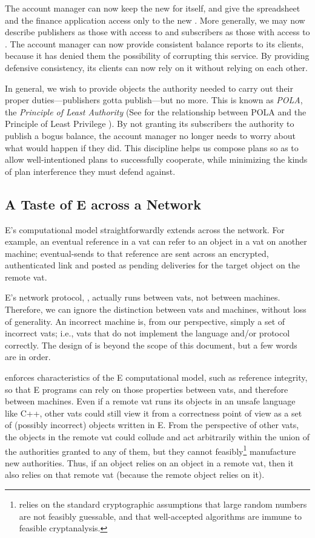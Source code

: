 \documentclass{llncs}
\begin{document}
The account manager can now keep the new  for
itself, and give the spreadsheet and the finance application access
only to the new . More generally, we may now
describe publishers as those with access to  and
subscribers as those with access to . The account
manager can now provide consistent balance reports to its clients,
because it has denied them the possibility of corrupting this
service. By providing defensive consistency, its clients can now rely
on it without relying on each other.

In general, we wish to provide
objects the authority needed to carry out their proper
duties---publishers gotta publish---but no more. This is known as
\emph{POLA}, the \emph{Principle of Least Authority} (See
\cite{miller:paradigm} for the relationship between POLA and the
Principle of Least Privilege \cite{SaltzerSc75}). By not granting its
subscribers the authority to publish a bogus balance, the account
manager no longer needs to worry about what would happen if they
did. This discipline helps us compose plans so as to allow
well-intentioned plans to successfully cooperate, while minimizing the
kinds of plan interference they must defend against.

\subsection{A Taste of E across a Network}

E's computational model straightforwardly extends across the network.
For example, an eventual reference in a vat can refer to an object in
a vat on another machine; eventual-sends to that reference are sent
across an encrypted, authenticated link and posted as pending
deliveries for the target object on the remote vat.

E's network protocol, , actually runs between vats, not
between machines. Therefore, we can ignore the distinction between
vats and machines, without loss of generality. An incorrect machine
is, from our perspective, simply a set of incorrect vats; i.e., vats
that do not implement the language and/or protocol correctly. The
design of  is beyond the scope of this document, but a
few words are in order.

 enforces characteristics of the E computational model,
such as reference integrity, so that E programs can rely on those
properties between vats, and therefore between machines. Even if a
remote vat runs its objects in an unsafe language like C++, other vats
could still view it from a correctness point of view as a set of
(possibly incorrect) objects written in E. From the perspective of
other vats, the objects in the remote vat could collude and act
arbitrarily within the union of the authorities granted to any of
them, but they cannot feasibly\footnote{
%
 relies on the standard cryptographic assumptions that
large random numbers are not feasibly guessable, and that
well-accepted algorithms are immune to feasible cryptanalysis.}
%
manufacture new authorities. Thus, if an object relies on an object in
a remote vat, then it also relies on that remote vat (because the
remote object relies on it).
\end{document}
